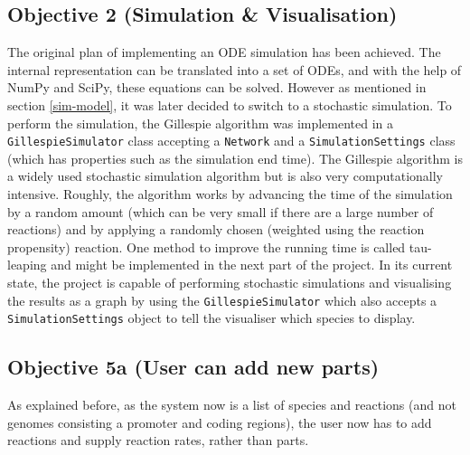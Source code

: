 \documentclass{article}
\begin{document}
	\subsection{Objective 2 (Simulation \& Visualisation)} 
	The original plan of implementing an ODE simulation has been achieved. The internal representation can be translated into a set of ODEs, and with the help of NumPy\cite{numpy} and SciPy\cite{scipy}, these equations can be solved. However as mentioned in section \ref{sim-model}, it was later decided to switch to a stochastic simulation. To perform the simulation, the Gillespie algorithm \cite{gillespie} was implemented in a \verb|GillespieSimulator| class accepting a \verb|Network| and a \verb|SimulationSettings| class (which has properties such as the simulation end time). The Gillespie algorithm is a widely used stochastic simulation algorithm but is also very computationally intensive. Roughly, the algorithm works by advancing the time of the simulation by a random amount (which can be very small if there are a large number of reactions) and by applying a randomly chosen (weighted using the reaction propensity) reaction. One method to improve the running time is called tau-leaping and might be implemented in the next part of the project. In its current state, the project is capable of performing stochastic simulations and visualising the results as a graph by using the \verb|GillespieSimulator| which also accepts a \verb|SimulationSettings| object to tell the visualiser which species to display.
	
	\subsection{Objective 5a (User can add new parts)} 
	As explained before, as the system now is a list of species and reactions (and not genomes consisting a promoter and coding regions), the user now has to add reactions and supply reaction rates, rather than parts.
	
\end{document}
